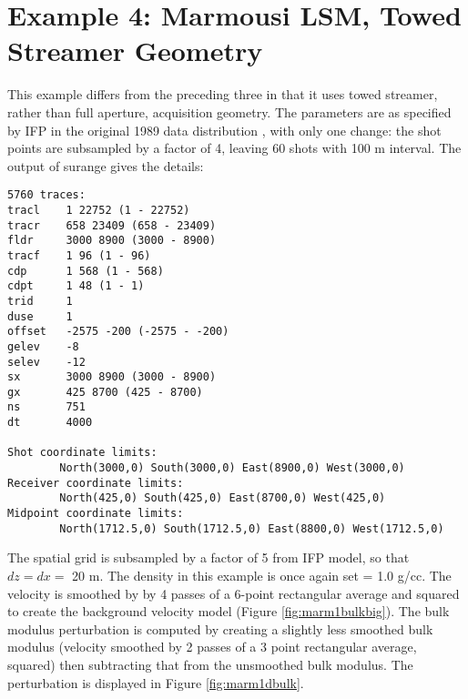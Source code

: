 


\newpage
\section{Example 4: Marmousi LSM, Towed Streamer Geometry}
This example differs from the preceding three in that it uses towed
streamer, rather than full aperture, acquisition geometry. The
parameters are as
specified by IFP in the original 1989 data distribution
\cite[]{BoLaVe:91}, with only one change: the shot points are subsampled by a factor of 4, leaving 60
shots with 100 m interval. The output of surange gives the details:
\begin{verbatim}
5760 traces:
tracl    1 22752 (1 - 22752)
tracr    658 23409 (658 - 23409)
fldr     3000 8900 (3000 - 8900)
tracf    1 96 (1 - 96)
cdp      1 568 (1 - 568)
cdpt     1 48 (1 - 1)
trid     1
duse     1
offset   -2575 -200 (-2575 - -200)
gelev    -8
selev    -12
sx       3000 8900 (3000 - 8900)
gx       425 8700 (425 - 8700)
ns       751
dt       4000

Shot coordinate limits:
        North(3000,0) South(3000,0) East(8900,0) West(3000,0)
Receiver coordinate limits:
        North(425,0) South(425,0) East(8700,0) West(425,0)
Midpoint coordinate limits:
        North(1712.5,0) South(1712.5,0) East(8800,0) West(1712.5,0)
\end{verbatim}

The spatial grid is subsampled by a factor of 5 from IFP
model, so that $dz = dx = $ 20 m. 
The density in this example is once again set = 1.0 g/cc. The velocity
is smoothed by by 4 passes of a 6-point rectangular average and
squared to create the background velocity model 
(Figure \ref{fig:marm1bulkbig}). The bulk modulus perturbation is
computed by creating a slightly less smoothed bulk modulus (velocity
smoothed by 2 passes of a 3 point rectangular average, squared) then
subtracting that from the unsmoothed bulk modulus. The perturbation is
displayed in Figure \ref{fig:marm1dbulk}.

